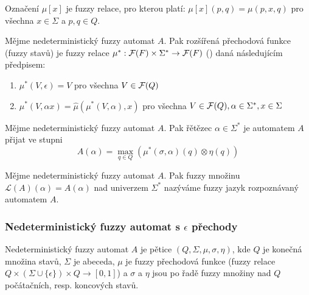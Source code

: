 \documentclass[a4paper,10pt]{article}
\begin{document}
\begin{note}
 Označení $\mu[x]$ je fuzzy relace, pro kterou platí: $\mu[x](p, q) = \mu(p, x, q)$ pro všechna $x \in \Sigma$ a $p, q \in Q$.
\end{note}

\begin{definition}\label{def-PreFunFuzzStav}
 Mějme nedeterministický fuzzy automat $A$. Pak rozšířená přechodová funkce (fuzzy stavů) je fuzzy relace $\mu^*: \mathcal{F}(F) \times \Sigma^* \rightarrow \mathcal{F}(F)$ () daná následujícím předpisem:
 \begin{enumerate}
  \item $\mu^*(V, \epsilon) = V$ pro všechna $V \in \mathcal{F}(Q)$
  \item $\mu^*(V, \alpha x) = \widehat{\mu}(\mu^*(V, \alpha), x)$ pro všechna $V \in \mathcal{F}(Q), \alpha \in \Sigma^*, x \in \Sigma$
 \end{enumerate}
\end{definition}

\begin{definition}\label{def-RetPriAut}
 Mějme nedeterministický fuzzy automat $A$. Pak řětězec $\alpha \in \Sigma^*$ je automatem $A$ přijat ve stupni
 $$
  A(\alpha) = \max_{q \in Q} (\mu^*(\sigma, \alpha)(q) \otimes \eta(q))
 $$
\end{definition}

\begin{definition}\label{def-JazRozpAut}
 Mějme nedeterministický fuzzy automat $A$. Pak fuzzy množinu $\mathcal{L}(A)(\alpha) = A(\alpha)$ nad univerzem $\Sigma^*$ nazýváme fuzzy jazyk rozpoznávaný automatem $A$.

\end{definition}

\subsubsection*{Nedeterministický fuzzy automat s $\epsilon$ přechody}

\begin{definition}\label{def-NedFuzzAutEpsPre}
 Nedeterministický fuzzy automat $A$ je pětice $(Q, \Sigma, \mu, \sigma, \eta)$, kde $Q$ je konečná množina stavů, $\Sigma$ je abeceda, $\mu$ je fuzzy přechodová funkce (fuzzy relace $Q \times (\Sigma \cup \{ \epsilon \}) \times Q \rightarrow [0, 1]$) a $\sigma$ a $\eta$ jsou po řadě fuzzy množiny nad $Q$ počátačních, resp. koncových stavů.
\end{definition}
\end{document}
